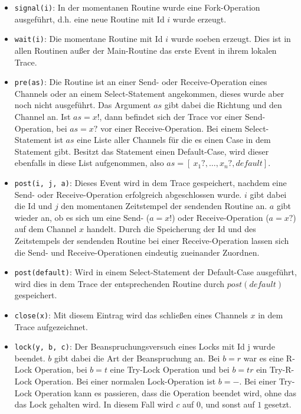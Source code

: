 \begin{itemize}
  \item \texttt{signal(i)}: In der momentanen Routine wurde eine Fork-Operation ausgeführt,
    d.h. eine neue Routine mit Id $i$ wurde erzeugt.
  \item \texttt{wait(i)}: Die momentane Routine mit Id $i$ wurde soeben erzeugt. Dies ist 
    in allen Routinen außer der Main-Routine das erste Event in ihrem lokalen Trace.
  \item \texttt{pre(as)}: Die Routine ist an einer Send- oder Receive-Operation eines 
    Channels oder an einem Select-Statement angekommen, dieses wurde aber noch nicht 
    ausgeführt. Das Argument $as$ gibt dabei die Richtung und den Channel an. 
    Ist $as = x!$, dann befindet sich der Trace vor einer Send-Operation, bei 
    $as = x?$ vor einer Receive-Operation. Bei einem Select-Statement ist 
    $as$ eine Liste aller Channels für die es einen 
    Case in dem Statement gibt. Besitzt das Statement einen Default-Case, wird
    dieser ebenfalls in diese List aufgenommen, also 
    $as = [\ x_1?, \ldots, x_n?, default]$.
  \item \texttt{post(i, j, a)}: Dieses Event wird in dem Trace gespeichert, nachdem 
    eine Send- oder Receive-Operation erfolgreich abgeschlossen wurde. 
    $i$ gibt dabei die Id und $j$ den momentanen Zeitstempel der sendenden Routine
    an. $a$ gibt wieder an, ob es sich um eine Send- ($a = x!$) oder Receive-Operation 
    ($a = x?$) auf dem Channel $x$ handelt. Durch die Speicherung der Id und des 
    Zeitstempels der sendenden Routine bei einer Receive-Operation lassen sich 
    die Send- und Receive-Operationen eindeutig zueinander Zuordnen.
  \item \texttt{post(default)}: Wird in einem Select-Statement der Default-Case ausgeführt,
    wird dies in dem Trace der entsprechenden Routine durch $post(default)$ 
    gespeichert.
  \item \texttt{close(x)}: Mit diesem Eintrag wird das schließen eines Channels $x$ 
    in dem Trace aufgezeichnet.
  \item \texttt{lock(y, b, c)}: Der Beanspruchungsversuch eines Locks mit Id j wurde beendet. 
    $b$ gibt dabei die Art der Beanspruchung an. Bei $b = r$ war es eine R-Lock
    Operation, bei $b = t$ eine Try-Lock Operation und bei $b = tr$ ein Try-R-Lock
    Operation. Bei einer normalen Lock-Operation ist $b = -$. Bei einer 
    Try-Lock Operation kann es passieren, dass die Operation beendet wird, 
    ohne das das Lock gehalten wird. In diesem Fall wird $c$ auf $0$, und 
    sonst auf $1$ gesetzt. 
\end{itemize}

